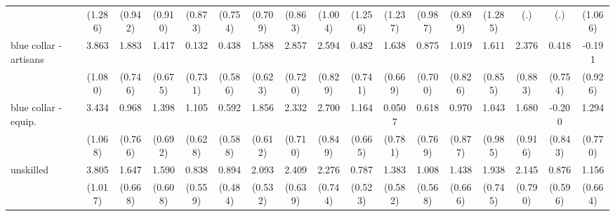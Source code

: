 {\begin{tabular}{l*{16}{c}}
                    &     (1.286)         &     (0.942)         &     (0.910)         &     (0.873)         &     (0.754)         &     (0.709)         &     (0.863)         &     (1.004)         &     (1.256)         &     (1.237)         &     (0.987)         &     (0.899)         &     (1.285)         &         (.)         &         (.)         &     (1.066)         \\
[1em]
blue collar - artisans&       3.863\sym{***}&       1.883\sym{*}  &       1.417\sym{*}  &       0.132         &       0.438         &       1.588\sym{*}  &       2.857\sym{***}&       2.594\sym{**} &       0.482         &       1.638\sym{*}  &       0.875         &       1.019         &       1.611         &       2.376\sym{**} &       0.418         &      -0.191         \\
                    &     (1.080)         &     (0.746)         &     (0.675)         &     (0.731)         &     (0.586)         &     (0.623)         &     (0.720)         &     (0.829)         &     (0.741)         &     (0.669)         &     (0.700)         &     (0.826)         &     (0.855)         &     (0.883)         &     (0.754)         &     (0.926)         \\
[1em]
blue collar - equip.&       3.434\sym{**} &       0.968         &       1.398\sym{*}  &       1.105         &       0.592         &       1.856\sym{**} &       2.332\sym{**} &       2.700\sym{**} &       1.164         &      0.0507         &       0.618         &       0.970         &       1.043         &       1.680         &      -0.200         &       1.294         \\
                    &     (1.068)         &     (0.766)         &     (0.692)         &     (0.628)         &     (0.588)         &     (0.612)         &     (0.710)         &     (0.849)         &     (0.665)         &     (0.781)         &     (0.769)         &     (0.877)         &     (0.985)         &     (0.916)         &     (0.843)         &     (0.770)         \\
[1em]
unskilled           &       3.805\sym{***}&       1.647\sym{*}  &       1.590\sym{**} &       0.838         &       0.894         &       2.093\sym{***}&       2.409\sym{***}&       2.276\sym{**} &       0.787         &       1.383\sym{*}  &       1.008         &       1.438\sym{*}  &       1.938\sym{**} &       2.145\sym{**} &       0.876         &       1.156         \\
                    &     (1.017)         &     (0.668)         &     (0.608)         &     (0.559)         &     (0.484)         &     (0.532)         &     (0.639)         &     (0.744)         &     (0.523)         &     (0.582)         &     (0.568)         &     (0.666)         &     (0.745)         &     (0.790)         &     (0.596)         &     (0.664)         \\

\end{tabular}}
